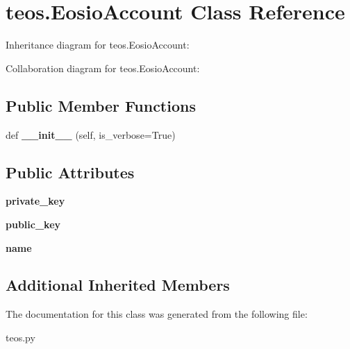 \hypertarget{classteos_1_1EosioAccount}{}\section{teos.\+Eosio\+Account Class Reference}
\label{classteos_1_1EosioAccount}


Inheritance diagram for teos.\+Eosio\+Account\+:


Collaboration diagram for teos.\+Eosio\+Account\+:
\subsection*{Public Member Functions}
\begin{DoxyCompactItemize}
\item 
\mbox{\label{classteos_1_1EosioAccount_a98c4dac88b37fd31b6937bd1513f2d6b}} 
def {\bfseries \+\_\+\+\_\+init\+\_\+\+\_\+} (self, is\+\_\+verbose=True)
\end{DoxyCompactItemize}
\subsection*{Public Attributes}
\begin{DoxyCompactItemize}
\item 
\mbox{\label{classteos_1_1EosioAccount_aa6319da236bd2cea30aca6dbf288694e}} 
{\bfseries private\+\_\+key}
\item 
\mbox{\label{classteos_1_1EosioAccount_a41e49abbebafa54a8abb283331a6d9de}} 
{\bfseries public\+\_\+key}
\item 
\mbox{\label{classteos_1_1EosioAccount_ab00b3c67bd5e8f4fadaad57b9c6063bc}} 
{\bfseries name}
\end{DoxyCompactItemize}
\subsection*{Additional Inherited Members}


The documentation for this class was generated from the following file\+:\begin{DoxyCompactItemize}
\item 
teos.\+py\end{DoxyCompactItemize}
